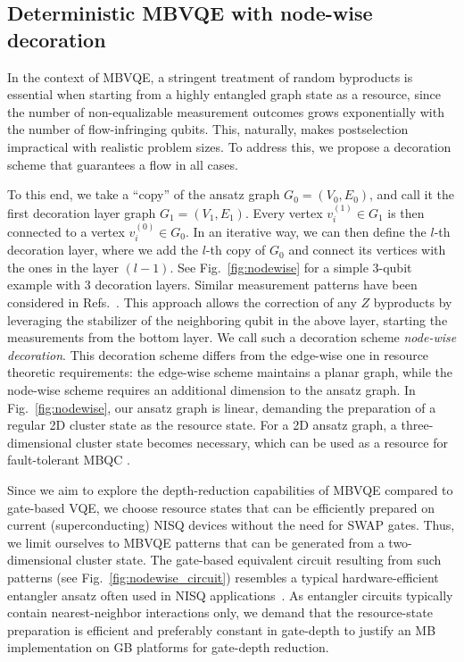 \documentclass[../main.tex]{subfiles}
\begin{document}
\subsection{Deterministic MBVQE with node-wise decoration}
In the context of MBVQE, a stringent treatment of random byproducts is essential when starting from a highly entangled graph state as a resource, since the number of non-equalizable measurement outcomes grows exponentially with the number of flow-infringing qubits. This, naturally, makes postselection impractical with realistic problem sizes. To address this, we propose a decoration scheme that guarantees a flow in all cases.

To this end, we take a ``copy'' of the ansatz graph $G_0=(V_0,E_0)$, and call it the first decoration layer graph $G_1=(V_1, E_1)$. Every vertex $v^{(1)}_i\in G_1$ is then connected to a vertex $v^{(0)}_i\in G_0$. In an iterative way, we can then define the $l$-th decoration layer, where we add the $l$-th copy of $G_0$ and connect its vertices with the ones in the layer $(l-1)$. 
See Fig.~\ref{fig:nodewise} for a simple $3$-qubit example with $3$ decoration layers. Similar measurement patterns have been considered in Refs.~\cite{marqversen2023applications,majumder2023variational}. This approach allows the correction of any $Z$ byproducts by leveraging the stabilizer of the neighboring qubit in the above layer, starting the measurements from the bottom layer. We call such a decoration scheme \textit{node-wise decoration}. This decoration scheme differs from the edge-wise one in resource theoretic requirements: the edge-wise scheme maintains a planar graph, while the node-wise scheme requires an additional dimension to the ansatz graph. In Fig.~\ref{fig:nodewise}, our ansatz graph is linear, demanding the preparation of a regular 2D cluster state as the resource state. For a 2D ansatz graph, a three-dimensional cluster state becomes necessary, which can be used as a resource for fault-tolerant MBQC \cite{larsen2021a,raussendorf2005a,brown2018universal}. 

Since we aim to explore the depth-reduction capabilities of MBVQE compared to gate-based VQE, we choose resource states that can be efficiently prepared on current (superconducting) NISQ devices without the need for SWAP gates. Thus, we limit ourselves to MBVQE patterns that can be generated from a two-dimensional cluster state. The gate-based equivalent circuit resulting from such patterns (see Fig.~\ref{fig:nodewise_circuit}) resembles a typical hardware-efficient entangler ansatz often used in NISQ applications~\cite{kandala2017hardware,moll2018quantum}. As entangler circuits typically contain nearest-neighbor interactions only, we demand that the resource-state preparation is efficient and preferably constant in gate-depth to justify an MB implementation on GB platforms for gate-depth reduction. 
\end{document}
